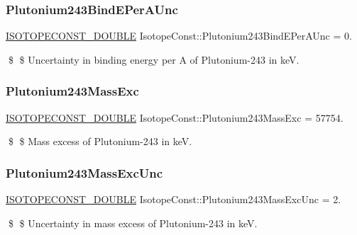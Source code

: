 \subsubsection{\texorpdfstring{Plutonium243\+Bind\+E\+Per\+A\+Unc}{Plutonium243BindEPerAUnc}}
{\footnotesize\ttfamily \mbox{\hyperlink{group___isotope_const-_macros_ga8f45a7272ce02c0b4c65c44636ed719a}{I\+S\+O\+T\+O\+P\+E\+C\+O\+N\+S\+T\+\_\+\+D\+O\+U\+B\+LE}} Isotope\+Const\+::\+Plutonium243\+Bind\+E\+Per\+A\+Unc = 0.}

\$ \$ Uncertainty in binding energy per A of Plutonium-\/243 in keV. \mbox{\label{group___isotope_const-_plutonium-_pu243_ga8770b5c334800968c2feb2391f668c1a}} 
\subsubsection{\texorpdfstring{Plutonium243\+Mass\+Exc}{Plutonium243MassExc}}
{\footnotesize\ttfamily \mbox{\hyperlink{group___isotope_const-_macros_ga8f45a7272ce02c0b4c65c44636ed719a}{I\+S\+O\+T\+O\+P\+E\+C\+O\+N\+S\+T\+\_\+\+D\+O\+U\+B\+LE}} Isotope\+Const\+::\+Plutonium243\+Mass\+Exc = 57754.}

\$ \$ Mass excess of Plutonium-\/243 in keV. \mbox{\label{group___isotope_const-_plutonium-_pu243_gaaf2b320b40b521e5991ac7c26c03408c}} 
\subsubsection{\texorpdfstring{Plutonium243\+Mass\+Exc\+Unc}{Plutonium243MassExcUnc}}
{\footnotesize\ttfamily \mbox{\hyperlink{group___isotope_const-_macros_ga8f45a7272ce02c0b4c65c44636ed719a}{I\+S\+O\+T\+O\+P\+E\+C\+O\+N\+S\+T\+\_\+\+D\+O\+U\+B\+LE}} Isotope\+Const\+::\+Plutonium243\+Mass\+Exc\+Unc = 2.}

\$ \$ Uncertainty in mass excess of Plutonium-\/243 in keV. \mbox{\label{group___isotope_const-_plutonium-_pu243_ga27e0c6fa18b4c6570c25a8b130860df4}} 
